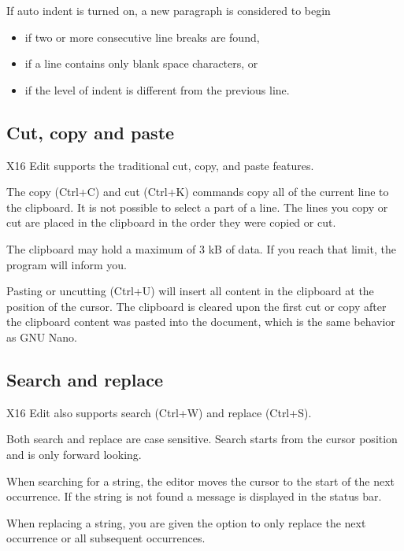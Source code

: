\documentclass{article}
\begin{document}
        If auto indent is turned on, a new paragraph is considered to begin

        \begin{itemize}
		    \item if two or more consecutive line breaks are found, 
            \item if a line contains only blank space characters, or
		    \item if the level of indent is different from the previous line.
	    \end{itemize}      

    \subsection{Cut, copy and paste}

        X16 Edit supports the traditional cut, copy, and paste features.

        The copy (Ctrl+C) and cut (Ctrl+K) commands copy all of the current line to the clipboard. It is not possible to select 
        a part of a line. The lines you copy or cut are placed in the clipboard in the order they were copied or cut.
        
        The clipboard may hold a maximum of 3 kB of data. If you reach that limit, the program will inform you.

        Pasting or uncutting (Ctrl+U) will insert all content in the clipboard at the position of the cursor. The clipboard
        is cleared upon the first cut or copy after the clipboard content was pasted into the document, which is the
        same behavior as GNU Nano.

    \subsection{Search and replace}

        X16 Edit also supports search (Ctrl+W) and replace (Ctrl+S).

        Both search and replace are case sensitive. Search starts from the
        cursor position and is only forward looking.

        When searching for a string, the editor moves the cursor to the start
        of the next occurrence. If the string is not found a message is
        displayed in the status bar.

        When replacing a string, you are given the option to only replace the
        next occurrence or all subsequent occurrences.
\end{document}
